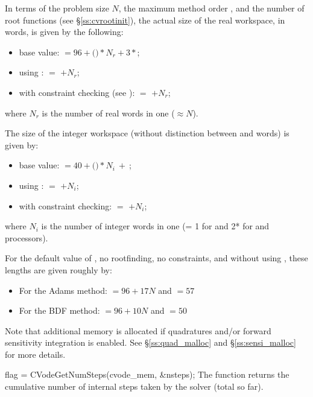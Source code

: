 {
  In terms of the problem size $N$, the maximum method order , and
  the number  of root functions (see \S\ref{ss:cvrootinit}),
  the actual size of the real workspace, in  words, is
  given by the following:
  \begin{itemize}
  \item base value:  $= 96 + ($$)*N_r + 3*$;
  \item using :  $=$  $+ N_r$;
  \item with constraint checking (see ):
     $=$  $+ N_r$;
  \end{itemize}
  where $N_r$ is the number of real words in one  ($\approx N$).

  The size of the integer workspace (without distinction between 
  and  words) is given by:
  \begin{itemize}
  \item base value:  $= 40 + ($$)*N_i ~ + ~ $;
  \item using :  $=$  $+ N_i$;
  \item with constraint checking:  $=$  $+ N_i$;
  \end{itemize}
  where $N_i$ is the number of integer words in one 
  (= 1 for {\nvecs} and 2* for {\nvecp} and  processors).

  For the default value of , no rootfinding, no constraints, and
  without using , these lengths are given roughly by:
  \begin{itemize}
  \item For the Adams method:  $= 96 + 17N$ and  $= 57$
  \item For the BDF method:  $= 96 + 10N$ and  $= 50$
  \end{itemize}

  Note that additional memory is allocated if quadratures and/or forward sensitivity
  integration is enabled. See \S\ref{ss:quad_malloc} and \S\ref{ss:sensi_malloc}
  for more details.
}
{
  flag = CVodeGetNumSteps(cvode\_mem, \&nsteps);
}
{
  The function  returns the cumulative number of internal
  steps taken by the solver (total so far).
}
